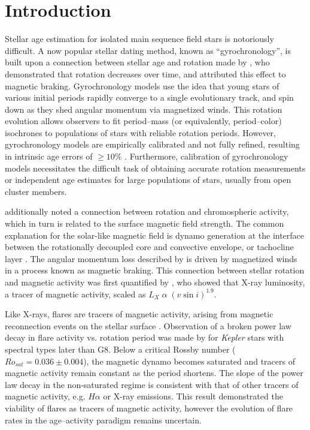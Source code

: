\documentclass[preprint2]{aastex61}
\newcommand{\Kepler}{\textsl{Kepler}\xspace}
\begin{document}


\section{Introduction}

Stellar age estimation for isolated main sequence field stars is notoriously difficult. A now popular stellar dating method, known as ``gyrochronology'', is built upon a connection between stellar age and rotation made by \citet{skumanich1972}, who demonstrated that rotation decreases over time, and attributed this effect to magnetic braking. Gyrochronology models use the idea that young stars of various initial periods rapidly converge to a single evolutionary track, and spin down as they shed angular momentum via magnetized winds. This rotation evolution allows observers to fit period--mass (or equivalently, period--color) isochrones to populations of stars with reliable rotation periods. However, gyrochronology models are empirically calibrated and not fully refined, resulting in intrinsic age errors of $\geq 10 \%$ \citep{meibom2015}. Furthermore, calibration of gyrochronology models necessitates the difficult task of obtaining accurate rotation measurements or independent age estimates for large populations of stars, usually from open cluster members.

\citet{skumanich1972} additionally noted a connection between rotation and chromospheric activity, which in turn is related to the surface magnetic field strength. The common explanation for the solar-like magnetic field is dynamo generation at the interface between the rotationally decoupled core and convective envelope, or tachocline layer \citep{barnes2003}. The angular momentum loss described by \citet{skumanich1972} is driven by magnetized winds in a process known as magnetic braking. This connection between stellar rotation and magnetic activity was first quantified by \citet{pallavicini1981}, who showed that X-ray luminosity, a tracer of magnetic activity, scaled as $L_X\;\alpha\;(v\sin i)^{1.9}$.

 Like X-rays, flares are tracers of magnetic activity, arising from magnetic reconnection events on the stellar surface \citep{cram&mullan1979}. Observation of a broken power law decay in flare activity vs. rotation period was made by \citet{davenport2016} for \Kepler stars with spectral types later than G8. Below a critical Rossby number ($Ro_{sat} = 0.036\pm0.004$), the magnetic dynamo becomes saturated and tracers of magnetic activity remain constant as the period shortens. The slope of the power law decay in the non-saturated regime is consistent with that of other tracers of magnetic activity, e.g. $H\alpha$ or X-ray emissions. This result demonstrated the viability of flares as tracers of magnetic activity, however the evolution of flare rates in the age--activity paradigm remains uncertain.
\end{document}
